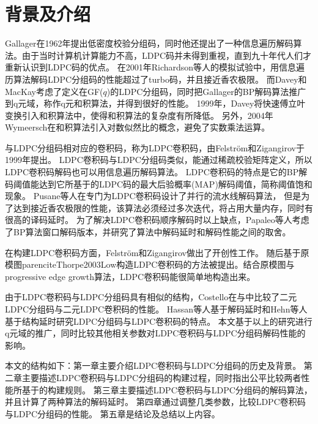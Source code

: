 \chapter{背景及介绍}
Gallager在1962年提出低密度校验分组码\parencite{Gallager1963Low}，同时他还提出了一种信息遍历解码算法。由于当时计算机计算能力不高，LDPC码并未得到重视，直到九十年代人们才重新认识到LDPC码的优点。
在2001年Richardson等人的模拟试验中\parencite{Richardson2001Design}，用信息遍历算法解码LDPC分组码的性能超过了turbo码，并且接近香农极限。
而Davey和MacKay考虑了定义在GF($q$)的LDPC分组码\parencite{Davey1998Low}，同时把Gallager的BP解码算法推广到q元域，称作q元和积算法，并得到很好的性能。
1999年，Davey将快速傅立叶变换引入和积算法中，使得和积算法的复杂度有所降低\parencite{Davey1999Error}。
另外，2004年Wymeersch在和积算法引入对数似然比的概念，避免了实数乘法运算\parencite{Wymeersch2004Log}。

与LDPC分组码相对应的卷积码，称为LDPC卷积码，由Felström和Zigangirov\parencite{Felstrom1999Time}于1999年提出。
LDPC卷积码与LDPC分组码类似，能通过稀疏校验矩阵定义，所以LDPC卷积码解码也可以用信息遍历解码算法。
LDPC卷积码的特点是它的BP解码阈值能达到它所基于的LDPC码的最大后验概率(MAP)解码阈值\parencite{Kudekar2010Threshold}，简称阈值饱和现象。
Pusane等人在\parencite{Pusane2008Implementation}专门为LDPC卷积码设计了并行的流水线解码算法，
但是为了达到接近香农极限的性能，该算法必须经过多次迭代，将占用大量内存，同时有很高的译码延时。
为了解决LDPC卷积码顺序解码时以上缺点，Papaleo等人考虑了BP算法窗口解码版本\parencite{Papaleo2010Windowed}，并研究了算法中解码延时和解码性能之间的取舍。

在构建LDPC卷积码方面，Felström和Zigangirov做出了开创性工作\parencite{Felstrom1999Time}。
随后基于原模图parencite{Thorpe2003Low}构造LDPC卷积码的方法被提出。结合原模图与progressive edge growth算法\parencite{Hu2005Regular}，LDPC卷积码能很简单地构造出来。

由于LDPC卷积码与LDPC分组码具有相似的结构，Costello在\parencite{Costello2006A}与\parencite{Costello2007A}中比较了二元LDPC分组码与二元LDPC卷积码的性能。
Hassan等人基于解码延时\parencite{Ul2012Comparison}和Hehn等人基于结构延时\parencite{Hehn2009LDPC}研究LDPC分组码与LDPC卷积码的特点。
本文基于以上的研究进行q元域的推广，同时比较其他相关参数对LDPC卷积码与LDPC分组码解码性能的影响。





















本文的结构如下：第一章主要介绍LDPC卷积码与LDPC分组码的历史及背景。
第二章主要描述LDPC卷积码与LDPC分组码的构建过程，同时指出公平比较两者性能所基于的构建规则。
第三章主要描述LDPC卷积码与LDPC分组码的解码算法，并且计算了两种算法的解码延时。
第四章通过调整几类参数，比较LDPC卷积码与LDPC分组码的性能。
第五章是结论及总结以上内容。